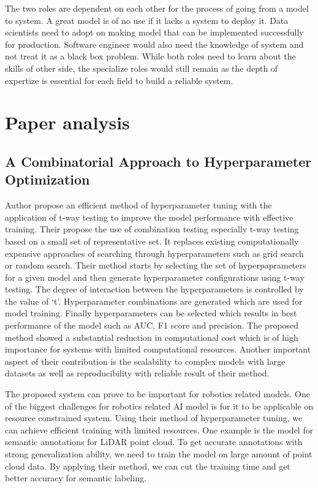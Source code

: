 \documentclass{article}
\begin{document}
The two roles are dependent on each other for the process of going from a model to system. A great model is of no use if it lacks a system to deploy it. Data scientists need to adopt on making model that can be implemented successfully for production. Software engineer would also need the knowledge of system and not treat it as a black box problem. While both roles need to learn about the skills of other side, the specialize roles would still remain as the depth of expertize is essential for each field to build a reliable system.



\section{Paper analysis}


\subsection{A Combinatorial Approach to Hyperparameter Optimization \cite{khadka2024combinatorial}}

Author propose an efficient method of hyperparameter tuning with the application of t-way testing to improve the model performance with effective training. Their propose the use of combination testing especially t-way testing based on a small set of representative set. It replaces existing computationally expensive approaches of searching through hyperparameters such as grid search or random search. Their method starts by selecting the set of hyperpaprameters for a given model and then generate hyperparameter configurations using t-way testing. The degree of interaction between the hyperparameters is controlled by the value of `t'. Hyperparameter combinations are generated which are used for model training. Finally hyperparameters can be selected which results in best performance of the model such as AUC, F1 score and precision. The proposed method showed a substantial reduction in computational cost which is of high importance for systems with limited computational resources. Another important aspect of their contribution is the scalability to complex models with large datasets as well as reproducibility with reliable result of their method.

The proposed system can prove to be important for robotics related models. One of the biggest challenges for robotics related AI model is for it to be applicable on resource constrained system. Using their method of hyperparameter tuning, we can achieve efficient training with limited resources. One example is the model for semantic annotations for LiDAR point cloud. To get accurate annotations with strong generalization ability, we need to train the model on large amount of point cloud data. By applying their method, we can cut the training time and get better accuracy for semantic labeling.
\end{document}

